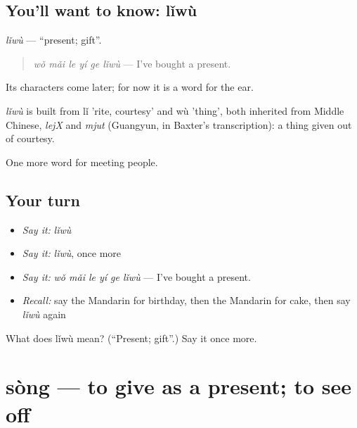 \subsection*{You'll want to know: lǐwù}
\emph{lǐwù} — \textquotedblleft{}present; gift\textquotedblright{}.

\begin{quote}
\emph{wǒ mǎi le yí ge lǐwù} — I've bought a present.
\end{quote}

Its characters come later; for now it is a word for the ear.

\begin{cousinweb}
\emph{lǐwù} is built from lǐ 'rite, courtesy' and wù 'thing', both inherited from Middle Chinese, \emph{lejX} and \emph{mjut} (Guangyun, in Baxter's transcription): a thing given out of courtesy.
\end{cousinweb}

\begin{grammarlens}[title={What you've built}]
One more word for meeting people.
\end{grammarlens}

\subsection*{Your turn}
\begin{itemize}
\raggedright
  \item \emph{Say it:} \emph{lǐwù}
  \item \emph{Say it:} \emph{lǐwù}, once more
  \item \emph{Say it:} \emph{wǒ mǎi le yí ge lǐwù} — I've bought a present.
  \item \emph{Recall:} say the Mandarin for birthday, then the Mandarin for cake, then say \emph{lǐwù} again
\end{itemize}

\begin{tcolorbox}[breakable,colback=teal!4,colframe=teal!35!black,title={Before you move on}]
What does lǐwù mean? (\textquotedblleft{}Present; gift\textquotedblright{}.) Say it once more.
\end{tcolorbox}
\section[sòng]{sòng — to give as a present; to see off}

\label{lesson:ZH-C75-song}



